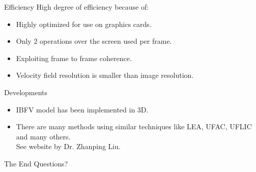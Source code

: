 \documentclass[red]{beamer}
\begin{document}
\begin{frame}{Efficiency}
  High degree of efficiency because of:
  \begin{itemize}
  \item 
    Highly optimized for use on graphics cards.
  \item
    Only 2 operations over the screen used per frame.
  \item
    Exploiting frame to frame coherence.
  \item
    Velocity field resolution is smaller than image resolution.
  \end{itemize}
\end{frame}

\begin{frame}{Developments}
  \begin{itemize}
  \item 
    IBFV model has been implemented in 3D.
  \item
    There are many methods using similar techniques like LEA, UFAC, UFLIC and many others. \\
    See website by Dr. Zhanping Liu.
  \end{itemize}

  \let\thefootnote\relax{}
  \let\thefootnote\relax{}
\end{frame}

\begin{frame}{The End}
  \huge{Questions?}
\end{frame}
\end{document}
